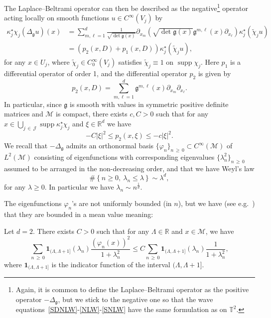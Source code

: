 \documentclass[AHL,Unicode,longabstracts,published]{cedram}
\newcommand{\R}{\mathbb{R}}
\newcommand{\T}{\mathbb{T}}
\DeclareMathOperator*{\supp}{supp}
\newcommand{\ind}{\mathbf{1}}
\newcommand{\J}{\mathcal{J}}
\newcommand{\M}{\mathcal{M}}
\newcommand{\g}{\mathfrak{g}}
\newcommand{\Ld}{\Lambda}
\newcommand{\Dlg}{\Delta_{\g}}
\newcommand{\kk}{\kappa}
\newcommand{\wt}{\widetilde}
\begin{document}
The Laplace--Beltrami operator can then be described as the negative\footnote{Again, it is common to define the Laplace--Beltrami operator as the positive operator $-\Dlg$, but we stick to the negative one so that the wave equations~\eqref{SDNLW}-\eqref{NLW}-\eqref{SNLW} have the same formulation as on $\T^2$.} operator acting locally on smooth functions $u\in C^{\infty}(V_j)$ by
\begin{align*}
\kk_j^{\star}\chi_j(\Dlg u)(x) &= \sum_{m,\ell=1}^d\frac{1}{\sqrt{\det\g(x)}}\partial_{x_m}\left(\sqrt{\det\g(x)}\g^{m,\ell}(x)\partial_{x_\ell}\right)\kk_j^{\star}\left(\wt\chi_j u\right)\\
&=\left(p_{2}(x,D)+p_{1}(x,D)\right)\kk_j^{\star}\left(\wt\chi_j u\right),
\end{align*}
for any $x\in U_j$, where $\wt\chi_j \in C^{\infty}_0(V_j)$ satisfies $\wt\chi_j\equiv 1$ on $\supp\chi_j$. Here $p_1$ is a differential operator of order 1, and the differential operator $p_{2}$ is given by
\begin{equation}\label{def-psDelta}
p_{2}(x,D)=\sum_{m,\ell=1}^d\g^{m,\ell}(x)\partial_{x_m}\partial_{x_\ell}.
\end{equation}
In particular, since $\g$ is smooth with values in symmetric positive definite matrices and $\M$ is compact, there exists $c,C>0$ such that for any $x\in \bigcup_{j\,\in\,\J}\supp\kk_j^\star \chi_j$ and $\xi\in\R^d$ we have
\begin{equation}\label{bound-p}
-C|\xi|^2\leq p_{2}(x,\xi)\leq -c|\xi|^2.
\end{equation}
We recall that $-\Dlg$ admits an orthonormal basis $\{\varphi_n\}_{n\,\geq\,0}\subset C^{\infty}(\M)$ of $L^2(\M)$ consisting of eigenfunctions with corresponding eigenvalues $\{\lambda_n^2\}_{n\,\geq\,0}$ assumed to be arranged in the non-decreasing order, and that we have Weyl's law
\begin{equation}\label{Weyl}
\#\left\{n\ge 0,~\lambda_n \leq \lambda\right\} \sim \lambda^d,
\end{equation}
for any $\lambda\geq 0$. In particular we have $\lambda_n \sim n^\frac1d$.

The eigenfunctions $\varphi_n$'s are not uniformly bounded (in $n$), but we have (see e.g.~\cite[Proposition~8.3]{BTT1}) that they are bounded in a mean value meaning:

\begin{lemm}\label{LEM:ev}
Let $d=2$. There exists $C>0$ such that for any $\Ld\in\R$ and $x\in\M$, we have
\begin{equation*}
\sum_{n\,\geq\,0}\ind_{(\Ld,\Ld+1]}(\lambda_n)\frac{(\varphi_n(x))^2}{1+\lambda_n^2}\leq C\sum_{n\,\geq\,0}\ind_{(\Ld,\Ld+1]}(\lambda_n)\frac{1}{1+\lambda_n^2},
\end{equation*}
where $\ind_{(\Ld,\Ld+1]}$ is the indicator function of the interval $(\Ld,\Ld+1]$.
\end{lemm}
\end{document}
